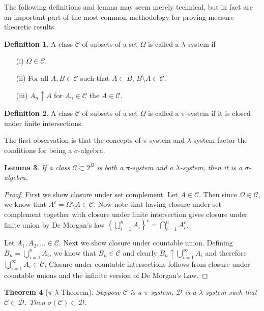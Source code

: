 \documentclass{amsart}
\newtheorem{thm}{Theorem}[section]
\newtheorem{lem}[thm]{Lemma}
\theoremstyle{remark}
\theoremstyle{definition}
\newtheorem{defn}[thm]{Definition}
\begin{document}
The following definitions and lemma may seem merely technical, but in fact are
an important part of the most common methodology for proving measure
theoretic results.  
\begin{defn}A class $\mathcal{C}$ of subsets of a set $\Omega$ is called a $\lambda$-system if
\begin{itemize}
\item[(i)] $\Omega \in \mathcal{C} $.
\item[(ii)] For all $A,B \in \mathcal{C}$ such that $A \subset B$,
  $B \setminus A \in \mathcal{C}$.
\item[(iii)] $A_n \uparrow A$ for $A_n \in \mathcal{C}$ the $A \in \mathcal{C}$.
\end{itemize}
\end{defn}
\begin{defn}A class $\mathcal{C}$ of subsets of a set $\Omega$ is
  called a $\pi$-system if it is closed under finite intersections.
\end{defn}
The first observation is that the concepts of $\pi$-system and
$\lambda$-system factor the conditions for being a $\sigma$-algebra.
\begin{lem}\label{PiLambdaSigma}If a class $\mathcal{C} \subset 2^\Omega$ is both a
  $\pi$-system and a $\lambda$-system, then it is a $\sigma$-algebra.
\end{lem}
\begin{proof}
First we show closure under set complement.  Let $A \in \mathcal{C}$.
Then since $\Omega \in \mathcal{C}$, we know that $A^c = \Omega
\setminus A \in \mathcal{C}$.  Now note that having closure under set complement
together with closure under finite intersection gives closure under
finite union by De Morgan's law $\left \{ \bigcup_{i=1}^n A_i \right \} ^
c =  \bigcap_{i=1}^n A_i^c $.

Let $A_1, A_2, \dots \in \mathcal{C}$.  Next we show closure under
countable union.  Defining $B_n = \bigcup_{i=1}^n A_i$, we know that
$B_n \in \mathcal{C}$ and clearly $B_n \uparrow \bigcup_{i=1}^\infty
A_i$ and therefore $\bigcup_{i=1}^\infty A_i \in \mathcal{C}$.
Closure under countable intersections follows from closure under
countable unions and the infinite version of De Morgan's Law.
\end{proof}
\begin{thm}[$\pi$-$\lambda$ Theorem]\label{MonotoneClassTheorem}Suppose $\mathcal{C}$ is a $\pi$-system, $\mathcal{D}$ is a
  $\lambda$-system such that $\mathcal{C} \subset \mathcal{D}$.  Then
  $\sigma(\mathcal{C}) \subset \mathcal{D}$.
\end{thm}
\end{document}
